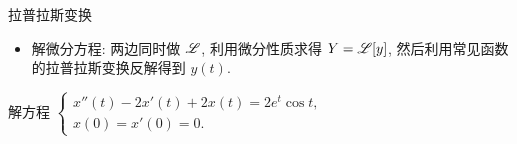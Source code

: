 \documentclass[12pt]{ctexbeamer}
\begin{document}
\begin{frame}{拉普拉斯变换}
\begin{itemize}
\item 解微分方程: 两边同时做 $\mathscr{L}$, 利用微分性质求得 $Y=\mathscr{L}[y]$, 然后利用常见函数的拉普拉斯变换反解得到 $y(t)$.
\end{itemize}
\begin{exercise}
解方程 
  $\begin{cases}
    x''(t)-2x'(t)+2x(t)=2e^t\cos t,&\\
    x(0)=x'(0)=0.&
  \end{cases}$
\end{exercise}
\end{frame}
\end{document}
